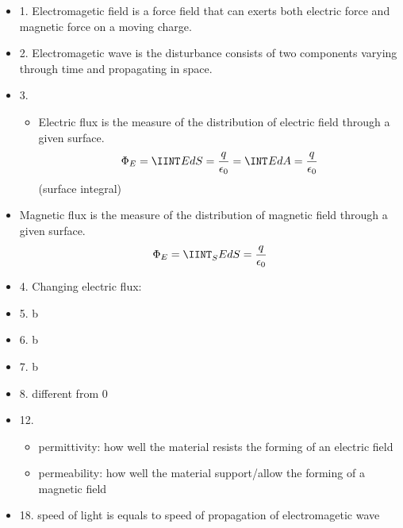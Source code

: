 \begin{itemize}
  \item 1. Electromagetic field is a force field that can exerts both
    electric force and magnetic force on a moving charge.
  \item 2. Electromagetic wave is the disturbance consists of two components
    varying through time and propagating in space.
  \item 3.
    \begin{itemize}
      \item Electric flux is the measure of the distribution of electric field
        through a given surface.
      \begin{align*}
        \Phi_E = \IINT_{}^{} E dS = \frac{q}{\epsilon_0}
               = \INT_{}^{} E dA = \frac{q}{\epsilon_0} 
      \end{align*}
        (surface integral)
    \end{itemize}
      \item Magnetic flux is the measure of the distribution of magnetic field
        through a given surface.
      \begin{align*}
        \Phi_E = \IINT_{S}^{} E dS = \frac{q}{\epsilon_0}
      \end{align*}
  \item 4. Changing electric flux:

  \item 5. b
  \item 6. b
  \item 7. b
  \item 8. different from 0
  \item 12.
    \begin{itemize}
      \item permittivity: how well the material resists the forming of an
        electric field
      \item permeability: how well the material support/allow the forming of a
        magnetic field
    \end{itemize}
  \item 18. speed of light is equals to speed of propagation of electromagetic
    wave
\end{itemize}
